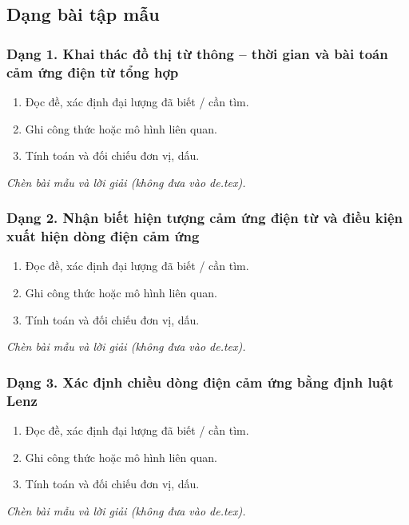 

\subsection{Dạng bài tập mẫu}
\subsubsection{Dạng 1. Khai thác đồ thị từ thông – thời gian và bài toán cảm ứng điện từ tổng hợp}
\begin{phuongphap}
\begin{enumerate}
\item Đọc đề, xác định đại lượng đã biết / cần tìm.
\item Ghi công thức hoặc mô hình liên quan.
\item Tính toán và đối chiếu đơn vị, dấu.
\end{enumerate}
\end{phuongphap}
\begin{vidumau}
\textit{Chèn bài mẫu và lời giải (không đưa vào de.tex).}
\end{vidumau}

\subsubsection{Dạng 2. Nhận biết hiện tượng cảm ứng điện từ và điều kiện xuất hiện dòng điện cảm ứng}
\begin{phuongphap}
\begin{enumerate}
\item Đọc đề, xác định đại lượng đã biết / cần tìm.
\item Ghi công thức hoặc mô hình liên quan.
\item Tính toán và đối chiếu đơn vị, dấu.
\end{enumerate}
\end{phuongphap}
\begin{vidumau}
\textit{Chèn bài mẫu và lời giải (không đưa vào de.tex).}
\end{vidumau}

\subsubsection{Dạng 3. Xác định chiều dòng điện cảm ứng bằng định luật Lenz}
\begin{phuongphap}
\begin{enumerate}
\item Đọc đề, xác định đại lượng đã biết / cần tìm.
\item Ghi công thức hoặc mô hình liên quan.
\item Tính toán và đối chiếu đơn vị, dấu.
\end{enumerate}
\end{phuongphap}
\begin{vidumau}
\textit{Chèn bài mẫu và lời giải (không đưa vào de.tex).}
\end{vidumau}

